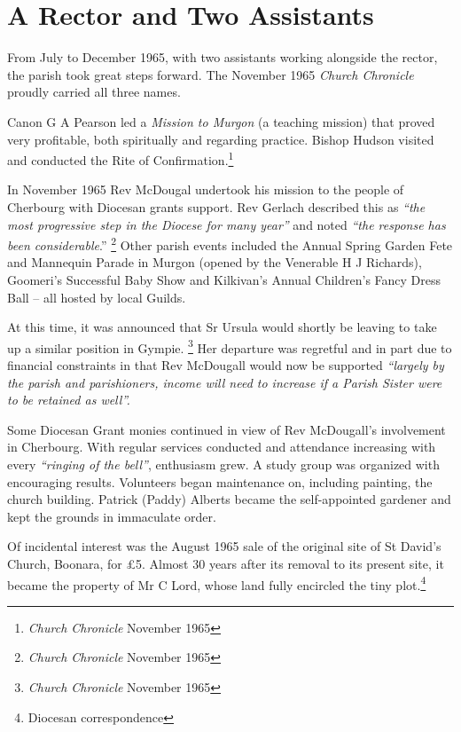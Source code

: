 \section{A Rector and Two Assistants}



From July to December 1965, with two assistants working alongside the rector, the parish took great steps forward. The November 1965 \emph{Church Chronicle} proudly carried all three names.



Canon G A Pearson led a \emph{Mission to Murgon} (a teaching mission) that proved very profitable, both spiritually and regarding practice. Bishop Hudson visited and conducted the Rite of Confirmation.\footnote{\emph{Church Chronicle} November 1965}


In November 1965 Rev McDougal undertook his mission to the people of Cherbourg with Diocesan grants support. Rev Gerlach described this as \emph{``the most progressive step in the Diocese for many year''} and noted \emph{``the response has been considerable}.'' \footnote{\emph{Church Chronicle} November 1965} Other parish events included the Annual Spring Garden Fete and Mannequin Parade in Murgon (opened by the Venerable H J Richards), Goomeri's Successful Baby Show and Kilkivan's Annual Children's Fancy Dress Ball -- all hosted by local Guilds.


At this time, it was announced that Sr Ursula would shortly be leaving to take up a similar position in Gympie. \footnote{\emph{Church Chronicle} November 1965} Her departure was regretful and in part due to financial constraints in that Rev McDougall would now be supported \emph{``largely by the parish and parishioners, income will need to increase if a Parish Sister were to be retained as well''.}


Some Diocesan Grant monies continued in view of Rev McDougall's involvement in Cherbourg. With regular services conducted and attendance increasing with every \emph{``ringing of the bell''}, enthusiasm grew. A study group was organized with encouraging results. Volunteers began maintenance on, including painting, the church building. Patrick (Paddy) Alberts became the self-appointed gardener and kept the grounds in immaculate order.



Of incidental interest was the August 1965 sale of the original site of St David's Church, Boonara, for \pounds5. Almost 30 years after its removal to its present site, it became the property of Mr C Lord, whose land fully encircled the tiny plot.\footnote{Diocesan correspondence}


